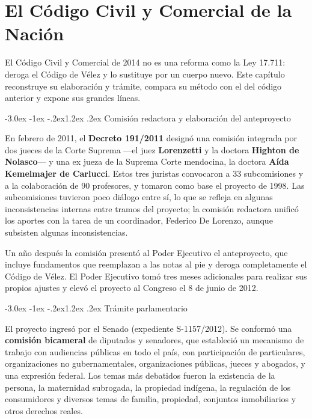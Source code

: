 \documentclass[12pt,oneside]{book}
\makeatletter
\renewcommand\section{\@startsection{section}{1}{\z@}%
  {-3.0ex \@plus -1ex \@minus -.2ex}{1.2ex \@plus .2ex}%
  {\normalfont\large\bfseries\color{acento}}}
\makeatother
\begin{document}

\chapter{El Código Civil y Comercial de la Nación}
\label{cap:ccyc}

El Código Civil y Comercial de 2014 no es una reforma como la Ley 17.711: deroga el Código de Vélez y lo sustituye por un cuerpo nuevo. Este capítulo reconstruye su elaboración y trámite, compara su método con el del código anterior y expone sus grandes líneas.

\section{Comisión redactora y elaboración del anteproyecto}

En febrero de 2011, el \textbf{Decreto 191/2011} designó una comisión integrada por dos jueces de la Corte Suprema ---el juez \textbf{Lorenzetti} y la doctora \textbf{Highton de Nolasco}--- y una ex jueza de la Suprema Corte mendocina, la doctora \textbf{Aída Kemelmajer de Carlucci}. Estos tres juristas convocaron a 33 subcomisiones y a la colaboración de 90 profesores, y tomaron como base el proyecto de 1998. Las subcomisiones tuvieron poco diálogo entre sí, lo que se refleja en algunas inconsistencias internas entre tramos del proyecto; la comisión redactora unificó los aportes con la tarea de un coordinador, Federico De Lorenzo, aunque subsisten algunas inconsistencias.

Un año después la comisión presentó al Poder Ejecutivo el anteproyecto, que incluye fundamentos que reemplazan a las notas al pie y deroga completamente el Código de Vélez. El Poder Ejecutivo tomó tres meses adicionales para realizar sus propios ajustes y elevó el proyecto al Congreso el 8 de junio de 2012.

\section{Trámite parlamentario}

El proyecto ingresó por el Senado (expediente S-1157/2012). Se conformó una \textbf{comisión bicameral} de diputados y senadores, que estableció un mecanismo de trabajo con audiencias públicas en todo el país, con participación de particulares, organizaciones no gubernamentales, organizaciones públicas, jueces y abogados, y una expresión federal. Los temas más debatidos fueron la existencia de la persona, la maternidad subrogada, la propiedad indígena, la regulación de los consumidores y diversos temas de familia, propiedad, conjuntos inmobiliarios y otros derechos reales.
\end{document}
